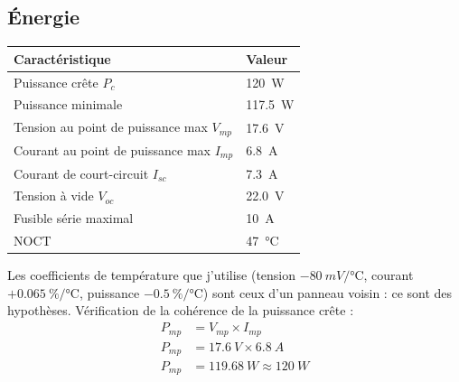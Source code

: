 \subsection*{Énergie}

\noindent
\begin{table}[H]
\centering
\begin{tabularx}{\linewidth}{lY}
\hline
Caractéristique & Valeur \\
\hline
Puissance crête $P_c$ & \qty{120}{W} \\
Puissance minimale & \qty{117,5}{W} \\
Tension au point de puissance max $V_{mp}$ & \qty{17,6}{V} \\
Courant au point de puissance max $I_{mp}$ & \qty{6,8}{A} \\
Courant de court-circuit $I_{sc}$ & \qty{7,3}{A} \\
Tension à vide $V_{oc}$ & \qty{22,0}{V} \\
Fusible série maximal & \qty{10}{A} \\
NOCT & \qty{47}{\celsius} \\
\hline
\end{tabularx}
\end{table}
Les coefficients de température que j'utilise (tension $-\qty{80}{mV/\celsius}$, courant $+\qty{0,065}{\percent/\celsius}$, puissance $-\qty{0,5}{\percent/\celsius}$) sont ceux d'un panneau voisin : ce sont des hypothèses. Vérification de la cohérence de la puissance crête :
\begin{align*}
P_{mp} &= V_{mp} \times I_{mp}\\
P_{mp} &= \qty{17,6}{V} \times \qty{6,8}{A}\\
P_{mp} &= \qty{119,68}{W} \approx \qty{120}{W}
\end{align*}

